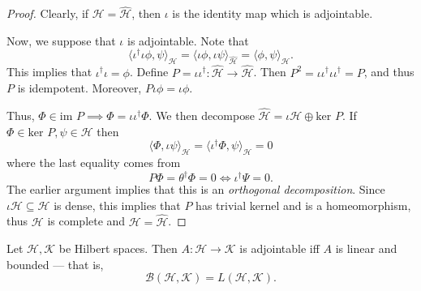 \documentclass[twoside,symmetric, openany, 12pt]{./tuftebook}
\theoremstyle{definition}
\theoremstyle{definition}
\theoremstyle{definition}
\begin{document}
\begin{proof}
	Clearly, if $\mathcal{H}=\hat{\mathcal{H}}$, then $\iota$ is the identity map which is adjointable.

	Now, we suppose that $\iota$ is adjointable. Note that 
	\[
		\langle \iota^\dagger \iota \phi, \psi\rangle_\mathcal{H}= \langle \iota \phi, \iota \psi\rangle_{\hat{\mathcal{H}}}=\langle \phi, \psi\rangle_\mathcal{H}
	.\] 
	This implies that $\iota^\dagger\iota = \phi$. Define $P=\iota\iota^\dagger: \hat{\mathcal{H}}\to \hat{\mathcal{H}}$. Then $P^2=\iota\iota^\dagger\iota\iota^\dagger=P$, and thus $P$ is idempotent. Moreover, $P\iota\phi=\iota\phi$.

 Thus, $\Phi\in \text{im }P\implies \Phi=\iota\iota^\dagger\Phi$. We then decompose $\hat{\mathcal{H}}=\iota \mathcal{H}\oplus \text{ker }P$. If $\Phi\in \text{ker }P, \psi\in \mathcal{H}$ then
	\[
	\langle \Phi, \iota\psi\rangle_\mathcal{H}=\langle \iota^\dagger\Phi, \psi\rangle_\mathcal{H}=0
\]
where the last equality comes from 
\[
P\Phi=\theta^\dagger \Phi = 0 \iff \iota^\dagger \Psi = 0
.\] 
The earlier argument implies that this is an \emph{orthogonal decomposition}. Since $\iota \mathcal{H}\subseteq \hat{\mathcal{H}}$ is dense, this implies that $P$ has trivial kernel and is a homeomorphism, thus $\mathcal{H}$ is complete and $\mathcal{H}= \hat{\mathcal{H}}$.
\end{proof}
\begin{Theorem}
	Let $\mathcal{H}, \mathcal{K}$ be Hilbert spaces. Then $A:\mathcal{H}\to \mathcal{K}$ is adjointable iff $A$ is linear and bounded --- that is,
	\[
	\mathcal{B}(\mathcal{H}, \mathcal{K}) = L(\mathcal{H}, \mathcal{K})
	.\] 
\end{Theorem}
\end{document}

